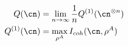 \begin{align} \label{qdef}
	Q(\cn) &= \lim_{n \to \infty} \frac{1}{n} Q^{(1)} (\cn^{\otimes n}) \\
	Q^{(1)} (\cn) &= \max_{\rho^A} I_{coh} (\cn, \rho^A)
\end{align}